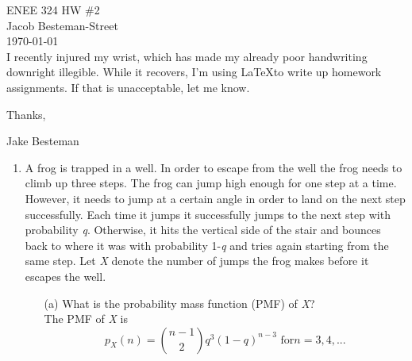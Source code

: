 \documentclass{report}
\begin{document}
ENEE 324 HW \#2 \\
Jacob Besteman-Street \\
\today \\

I recently injured my wrist, which has made my already poor handwriting downright illegible.
While it recovers, I'm using \LaTeX to write up homework assignments. If that is unacceptable, let me know.

Thanks,

Jake Besteman

\begin{enumerate}
\item A frog is trapped in a well.  In order to escape from the well the frog needs to climb up three steps.
The frog can jump high enough for one step at a time.
However, it needs to jump at a certain angle in order to land on the next step successfully.
Each time it jumps it successfully jumps to the next step with probability \textit{q}.
 Otherwise, it hits the vertical side of the stair and bounces back to where it was
 with probability 1-\textit{q} and tries again starting from the same step.  Let \textit{X}
 denote the number of jumps the frog makes before it escapes the well.

\begin{itemize}
\item[(a)] What is the probability mass function (PMF) of \textit{X}?\\ \newline
The PMF of \textit{X} is $$p_X(n) = \binom{n-1}{2}q^3(1-q)^{n-3} \text{ for} n = 3, 4, ...       $$



\end{itemize}
\end{enumerate}
\end{document}
